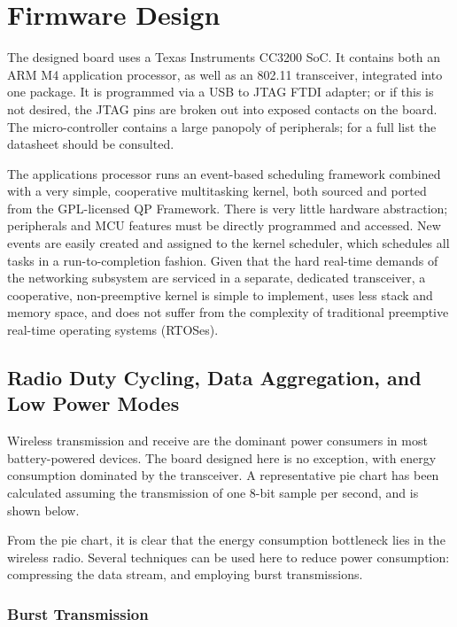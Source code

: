 \chapter{Firmware Design}

The designed board uses a Texas Instruments CC3200 SoC. It contains both an ARM M4 application processor, as well as an 802.11 transceiver, integrated into one package. It is programmed via a USB to JTAG FTDI adapter; or if this is not desired, the JTAG pins are broken out into exposed contacts on the board. The micro-controller contains a large panopoly of peripherals; for a full list the datasheet should be consulted.

The applications processor runs an event-based scheduling framework combined with a very simple, cooperative multitasking kernel, both sourced and ported from the GPL-licensed QP Framework. There is very little hardware abstraction; peripherals and MCU features must be directly programmed and accessed. New events are easily created and assigned to the kernel scheduler, which schedules all tasks in a run-to-completion fashion. Given that the hard real-time demands of the networking subsystem are serviced in a separate, dedicated transceiver, a cooperative, non-preemptive kernel is simple to implement, uses less stack and memory space, and does not suffer from the complexity of traditional preemptive real-time operating systems (RTOSes).
 
\section{Radio Duty Cycling, Data Aggregation, and Low Power Modes}

Wireless transmission and receive are the dominant power consumers in most battery-powered devices. The board designed here is no exception, with energy consumption dominated by the transceiver. A representative pie chart has been calculated assuming the transmission of one 8-bit sample per second, and is shown below.


From the pie chart, it is clear that the energy consumption bottleneck lies in the wireless radio. Several techniques can be used here to reduce power consumption: compressing the data stream, and employing burst transmissions.

\subsection{Burst Transmission}

